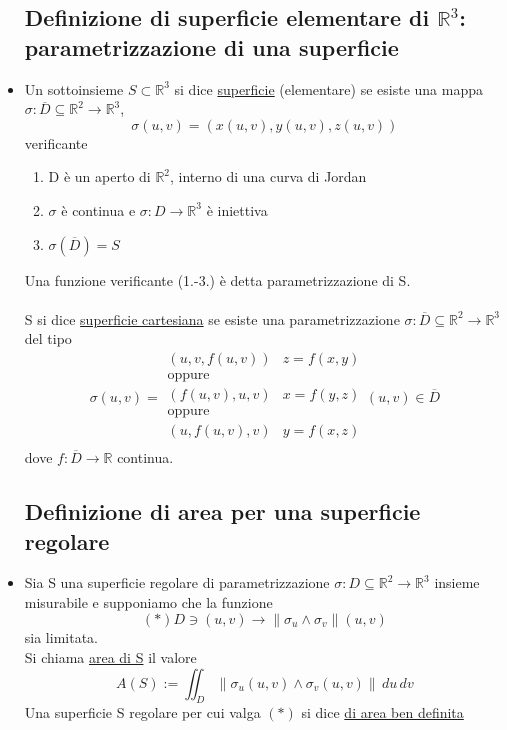 \documentclass{report}
\newcommand{\ace}{\`e }
\newcommand{\Ins}[1]{\mathbb{#1}}
\newcommand{\R}{\Ins{R}}
\newcommand{\norma}[1]{\left\lVert#1\right\rVert}
\begin{document}
\begin{itemize}
  \subsection{Definizione di superficie elementare di $\R^3$: parametrizzazione di una superficie}
  \item Un sottoinsieme $S\subset\R^3$ si dice \underline{superficie} (elementare) se esiste una mappa
        $\sigma:\overline{D}\subseteq\R^2\to\R^3$, 
        $$\sigma(u,v) = (x(u,v),y(u,v),z(u,v))$$
        verificante
        \begin{enumerate}
          \item D \ace un aperto di $\R^2$, interno di una curva di Jordan
          \item $\sigma$ \ace continua e $\sigma:D\to\R^3$ \ace iniettiva
          \item $\sigma(\overline{D})=S$
        \end{enumerate}
        Una funzione verificante (1.-3.) \ace detta parametrizzazione di S. \\\\
        S si dice \underline{superficie cartesiana} se esiste una parametrizzazione
        $\sigma : \overline{D}\subseteq\R^2\to\R^3$ del tipo
        $$\sigma(u,v) = \begin{array}{lr}
          (u,v,f(u,v)) & z = f(x,y) \\
          \text{oppure} \\
          (f(u,v),u,v) & x = f(y,z) \\
          \text{oppure} \\
          (u,f(u,v),v) & y = f(x,z) \\
        \end{array} (u,v)\in\overline{D}$$
        dove $f:\overline{D}\to\R$ continua.

  \subsection{Definizione di area per una superficie regolare}
  \item Sia S una superficie regolare di parametrizzazione $\sigma : D\subseteq \R^2 \to \R^3$
        insieme misurabile e supponiamo che la funzione 
        $$(*) D \ni (u,v) \to \norma{\sigma_u\wedge\sigma_v}(u,v)$$
        sia limitata. \\
        Si chiama \underline{area di S} il valore 
        $$A(S) := \iint_D \norma{\sigma_u(u,v)\wedge\sigma_v(u,v)}\,du\,dv$$
        Una superficie S regolare per cui valga $(*)$ si dice \underline{di area ben definita}


\end{itemize}
\end{document}
